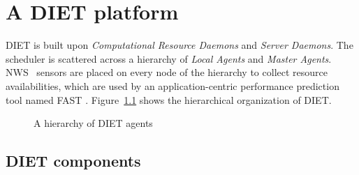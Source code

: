
\chapter{A DIET platform}
\label{ch:description}

DIET is built upon \emph{Computational Resource Daemons} and \emph{Server
Daemons}. The scheduler is scattered across a hierarchy of \emph{Local Agents}
and \emph{Master Agents}. NWS~\cite{WSH99} sensors are placed on every node of
the hierarchy to collect resource availabilities, which are used by an
application-centric performance prediction tool named FAST \cite{Qui02}.
Figure~\ref{fig:platform} shows the hierarchical organization of DIET.

\begin{figure}[htb]
 \begin{center}
  \label{fig:platform}
  \caption{A hierarchy of DIET agents}
 \end{center}
\end{figure}

\section{DIET components}
\label{sec:components}

